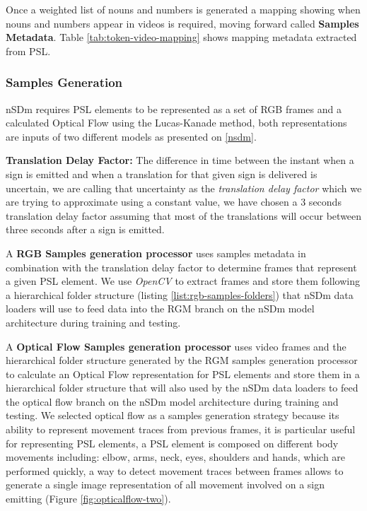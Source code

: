 \documentclass[twocolumn,conference]{article}
\begin{document}
Once a weighted list of nouns and numbers is generated a mapping showing when nouns and numbers appear in videos is required, moving forward called \textbf{Samples Metadata}. Table \ref{tab:token-video-mapping} shows mapping metadata extracted from PSL.

\subsubsection{Samples Generation}\label{samples-generation} 
nSDm requires PSL elements to be represented as a set of RGB frames and a calculated Optical Flow using the Lucas-Kanade method, both representations are inputs of two different models as presented on \ref{nsdm}.

\textbf{Translation Delay Factor: } The difference in time between the instant when a sign is emitted and when a translation for that given sign is delivered is uncertain, we are calling that uncertainty as the \textit{translation delay factor} which we are trying to approximate using a constant value, we have chosen a 3 seconds translation delay factor assuming that most of the translations will occur between three seconds after a sign is emitted.

A \textbf{RGB Samples generation processor} uses samples metadata in combination with the translation delay factor to determine frames that represent a given PSL element. We use \textit{OpenCV} to extract frames and store them following a hierarchical folder structure (listing \ref{list:rgb-samples-folders}) that nSDm data loaders will use to feed data into the RGM branch on the nSDm model architecture during training and testing.

A \textbf{Optical Flow Samples generation processor} uses video frames and the hierarchical folder structure generated by the RGM samples generation processor to calculate an Optical Flow representation for PSL elements and store them in a hierarchical folder structure that will also used by the nSDm data loaders to feed the optical flow branch on the nSDm model architecture during training and testing. We selected optical flow as a samples generation strategy because its ability to represent movement traces from previous frames, it is particular useful for representing PSL elements, a PSL element is composed on different body movements including: elbow, arms, neck, eyes, shoulders and hands, which are performed quickly, a way to detect movement traces between frames allows to generate a single image representation of all movement involved on a sign emitting (Figure \ref{fig:opticalflow-two}). 
\end{document}
